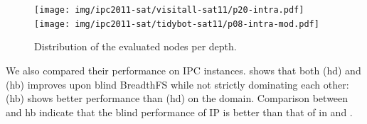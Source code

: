 \begin{figure}
 \texttt{[image: img/ipc2011-sat/visitall-sat11/p20-intra.pdf]}
 \texttt{[image: img/ipc2011-sat/tidybot-sat11/p08-intra-mod.pdf]}
 \caption{Distribution of the evaluated nodes per depth.}
 \label{fig:distribution}
\end{figure}

We also compared their performance on IPC instances.
 shows that both (hd) and (hb) improves upon blind BreadthFS while 
not strictly dominating each other: (hb) shows better performance than
(hd) on the  domain.
Comparison between \ro and hb indicate that the blind performance of IP is better than that of \ro in  and .

